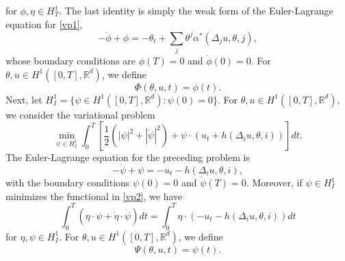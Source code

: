 \documentclass[12pt]{amsart}
\newcommand{\Rr}{{\mathbb{R}}}
\newcommand{\1}{{\chi}}
\newcommand{\lb}{\left(}
\newcommand{\rb}{\right)}
\theoremstyle{definition}
\begin{document}
                for $\phi,\eta \in H^1_T$. 
                The last identity is simply the weak form of the Euler-Lagrange equation for \eqref{vp1},
                \begin{equation}\label{MFM:eq:ELeq_phi_cont_dyn}
                        - \ddot \phi + \phi = -\theta_t + \sum_j \theta^j \alpha^*(\Delta_j u, \theta,j),
                \end{equation}
                whose boundary conditions are $\phi(T)=0$ and $\dot \phi(0)=0$. For $\theta, u\in H^1([0,T], \Rr^d)$, we define
                \begin{equation}\label{Phi}
                        \Phi(\theta, u, t)=\phi(t).
                \end{equation}
                Next, 
             let $H^1_I=\{\psi \in H^1([0,T], \Rr^d): \psi(0)=0\}$.
                                For $\theta, u\in H^1([0,T], \Rr^d)$, we consider the variational problem
                \begin{equation}
                \label{vp2}
                                \min_{\psi\in H^1_I} \int_0^T \left[\frac{1}{2}(|\psi|^2 + |\dot\psi|^2) + \psi \cdot \lb u_t + h(\Delta_i u, \theta,i) \rb \right] dt.                \end{equation}
                The Euler-Lagrange equation for the preceding problem is 
                \begin{equation}\label{MFM:eq:ELeq_psi_cont_dyn}
                        - \ddot \psi + \psi = - u_t - h(\Delta_i u, \theta,i),
                \end{equation}
                with the boundary conditions $\psi(0)=0$ and $\dot \psi(T)=0$. Moreover, if $\psi\in H^1_I$ minimizes the functional in \eqref{vp2}, we have
                \begin{equation*}
                \int_0^T \lb\eta \cdot\psi + \dot \eta \cdot\dot \psi\rb dt = \int_0^T \eta \cdot\lb - u_t - h(\Delta_i u, \theta,i) \rb dt
                \end{equation*}
                for $\eta, \psi\in H^1_I$. 
                 For $\theta, u\in H^1([0,T], \Rr^d)$, we define
                \begin{equation}\label{Psi}
                        \Psi(\theta, u, t)=\psi(t).
                \end{equation}
\end{document}
